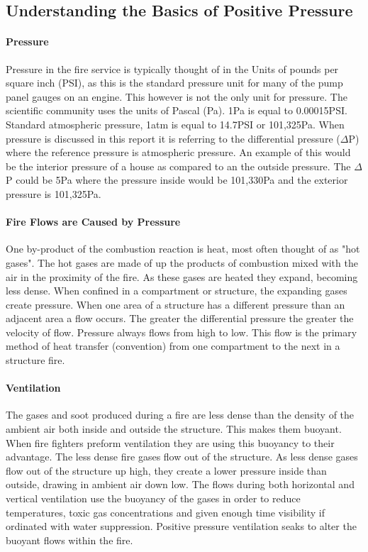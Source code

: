\documentclass{article}
\begin{document}
\subsection{Understanding the Basics of Positive Pressure}

\paragraph{Pressure} \mbox{}

Pressure in the fire service is typically thought of in the Units of pounds per square inch (PSI), as this is the standard pressure unit for many of the pump panel gauges on an engine. This however is not the only unit for pressure. The scientific community uses the units of Pascal (Pa).  1Pa is equal to 0.00015PSI. Standard atmospheric pressure, 1atm  is equal to 14.7PSI or 101,325Pa. When pressure is discussed in this report it is referring to the differential pressure ($\Delta$P) where the reference pressure is atmospheric pressure. An example of this would be the interior pressure of a house as compared to an the outside pressure. The $\Delta$P could be 5Pa where the pressure inside would be 101,330Pa and the exterior pressure is 101,325Pa.  

\paragraph{Fire Flows are Caused by Pressure} \mbox{}

One by-product of the combustion reaction is heat, most often thought of as "hot gases". The hot gases are made of up the products of combustion mixed with the air in the proximity of the fire. As these gases are heated they expand, becoming less dense. When confined in a compartment or structure, the expanding gases create pressure. When one area of a structure has a different pressure than an adjacent area a flow occurs. The greater the differential pressure the greater the velocity of flow. Pressure always flows from high to low. This flow is the primary method of heat transfer (convention) from one compartment to the next in a structure fire. 

\paragraph{Ventilation} \mbox{}

The gases and soot produced during a fire are less dense than the density of the ambient air both inside and outside the structure. This makes them buoyant. When fire fighters preform ventilation they are using this buoyancy to their advantage. The less dense fire gases flow out of the structure. As less dense gases flow out of the structure up high, they create a lower pressure inside than outside, drawing in ambient air down low. The flows during both horizontal and vertical ventilation use the buoyancy of the gases in order to reduce temperatures, toxic gas concentrations and given enough time visibility if ordinated with water suppression. Positive pressure ventilation seaks to alter the buoyant flows within the fire. 
\end{document}

